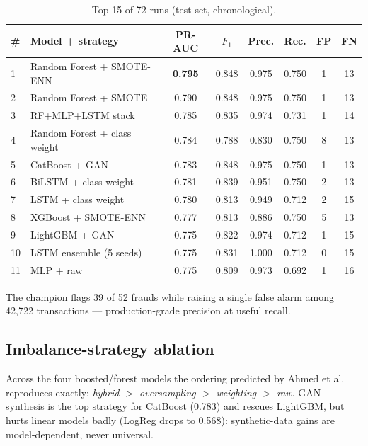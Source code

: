 \documentclass[11pt,a4paper]{article}
\begin{document}
\begin{table}[h]
      \centering\small
      \caption{Top 15 of 72 runs (test set, chronological).}
      \label{tab:leaderboard}
      \begin{tabular}{llcccccc}
            \toprule
            \# & Model + strategy & PR-AUC & $F_1$ & Prec. & Rec. & FP & FN\\
            \midrule
            1 & Random Forest + SMOTE-ENN & \textbf{0.795} & 0.848 & 0.975 & 0.750 & 1 & 13\\
            2 & Random Forest + SMOTE & 0.790 & 0.848 & 0.975 & 0.750 & 1 & 13\\
            3 & RF+MLP+LSTM stack & 0.785 & 0.835 & 0.974 & 0.731 & 1 & 14\\
            4 & Random Forest + class weight & 0.784 & 0.788 & 0.830 & 0.750 & 8 & 13\\
            5 & CatBoost + GAN & 0.783 & 0.848 & 0.975 & 0.750 & 1 & 13\\
            6 & BiLSTM + class weight & 0.781 & 0.839 & 0.951 & 0.750 & 2 & 13\\
            7 & LSTM + class weight & 0.780 & 0.813 & 0.949 & 0.712 & 2 & 15\\
            8 & XGBoost + SMOTE-ENN & 0.777 & 0.813 & 0.886 & 0.750 & 5 & 13\\
            9 & LightGBM + GAN & 0.775 & 0.822 & 0.974 & 0.712 & 1 & 15\\
            10 & LSTM ensemble (5 seeds) & 0.775 & 0.831 & 1.000 & 0.712 & 0 & 15\\
            11 & MLP + raw & 0.775 & 0.809 & 0.973 & 0.692 & 1 & 16\\
            \bottomrule
      \end{tabular}
\end{table}

The champion flags 39 of 52 frauds while raising a single false alarm among 42{,}722
transactions --- production-grade precision at useful recall.

\subsection{Imbalance-strategy ablation}
Across the four boosted/forest models the ordering predicted by Ahmed et al.~\cite{ahmed2025}
reproduces exactly: \emph{hybrid $>$ oversampling $>$ weighting $>$ raw}. GAN synthesis is the
top strategy for CatBoost (0.783) and rescues LightGBM, but hurts linear models badly
(LogReg drops to 0.568): synthetic-data gains are model-dependent, never universal.
\end{document}

